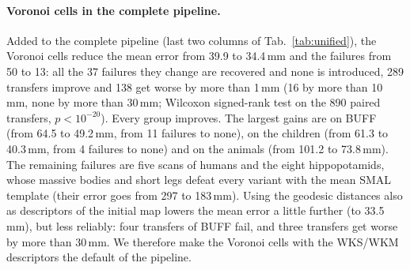\documentclass[11pt]{article}
\begin{document}
\paragraph{Voronoi cells in the complete pipeline.} Added to the complete
pipeline (last two columns of Tab.~\ref{tab:unified}), the Voronoi cells
reduce the mean error from 39.9 to 34.4\,mm and the failures from 50 to 13:
all the 37 failures they change are recovered and none is introduced, 289
transfers improve and 138 get worse by more than 1\,mm (16 by more than
10\,mm, none by more than 30\,mm; Wilcoxon signed-rank test on the 890 paired
transfers, $p < 10^{-20}$). Every group improves. The largest gains are on
BUFF (from 64.5 to 49.2\,mm, from 11 failures to none), on the children (from
61.3 to 40.3\,mm, from 4 failures to none) and on the animals (from 101.2 to
73.8\,mm). The remaining failures are five scans of humans and the eight
hippopotamids, whose massive bodies and short legs defeat every variant with
the mean SMAL template (their error goes from 297 to 183\,mm). Using the geodesic distances also as
descriptors of the initial map lowers the mean error a little further (to
33.5\,mm), but less reliably: four transfers of BUFF fail, and three
transfers get worse by more than 30\,mm. We therefore make the Voronoi cells
with the WKS/WKM descriptors the default of the pipeline.
\end{document}
